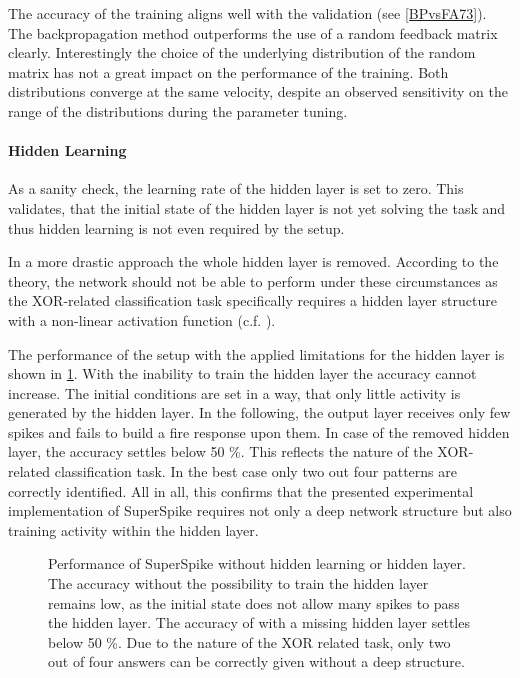 The accuracy of the training aligns well with the validation (see \cref{BPvsFA73}). The backpropagation method outperforms the use of a random feedback matrix clearly. Interestingly the choice of the underlying distribution of the random matrix has not a great impact on the performance of the training. Both distributions converge at the same velocity, despite an observed sensitivity on the range of the distributions during the parameter tuning.

\paragraph{Hidden Learning}
As a sanity check, the learning rate of the hidden layer is set to zero. This validates, that the initial state of the hidden layer is not yet solving the task and thus hidden learning is not even required by the setup.

In a more drastic approach the whole hidden layer is removed. According to the theory, the network should not be able to perform under these circumstances as the XOR-related classification task specifically requires a hidden layer structure with a non-linear activation function (c.f. \citealp{Goodfellow-et-al-2016}).

The performance of the setup with the applied limitations for the hidden layer is shown in \cref{hiddenlearning}. With the inability to train the hidden layer the accuracy cannot increase. The initial conditions are set in a way, that only little activity is generated by the hidden layer. In the following, the output layer receives only few spikes and fails to build a fire response upon them. In case of the removed hidden layer, the accuracy settles below 50 \%. This reflects the nature of the XOR-related classification task. In the best case only two out four patterns are correctly identified. 
All in all, this confirms that the presented experimental implementation of SuperSpike requires not only a deep network structure but also training activity within the hidden layer.

\begin{figure}[htb!]
		\centering
		
	\caption[Performance of SuperSpike without hidden learning or hidden layer.]{Performance of SuperSpike without hidden learning or hidden layer. The accuracy without the possibility to train the hidden layer remains low, as the initial state does not allow many spikes to pass the hidden layer. The accuracy of with a missing hidden layer settles below 50 \%. Due to the nature of the XOR related task, only two out of four answers can be correctly given without a deep structure.}
	\label{hiddenlearning}
\end{figure}

